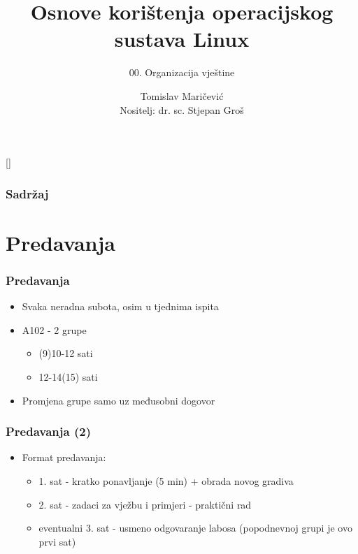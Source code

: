 \documentclass{beamer}
\title{Osnove korištenja operacijskog sustava Linux}
\subtitle{00. Organizacija vještine}
\author[Tomislav Maričević]{Tomislav Maričević\\{\small Nositelj: dr. sc. Stjepan Groš}}
\institute[FER]{Sveučilište u Zagrebu \\
				Fakultet elektrotehnike i računarstva}
\date{\todayiso}
\begin{document}
{
[] %

\begin{frame}
\maketitle
\end{frame}
}

\begin{frame}
\frametitle{Sadržaj}
\tableofcontents
\end{frame}

\section{Predavanja}
\begin{frame}[t]
\frametitle{Predavanja}
\begin{itemize}
	\item Svaka neradna subota, osim u tjednima ispita
	\item A102 - 2 grupe
	\begin{itemize}
		\item (9)10-12 sati
		\item 12-14(15) sati
	\end{itemize}
	\item Promjena grupe samo uz međusobni dogovor
\end{itemize}
\end{frame}

\begin{frame}[t]
\frametitle{Predavanja (2)}
\begin{itemize}
	\item Format predavanja:
	\begin{itemize}
		\item 1. sat - kratko ponavljanje (5 min) + obrada novog gradiva
		\item 2. sat - zadaci za vježbu i primjeri - praktični rad
		\item eventualni 3. sat - usmeno odgovaranje labosa (popodnevnoj grupi je ovo prvi sat)
	\end{itemize}
\end{itemize}
\end{frame}
\end{document}
